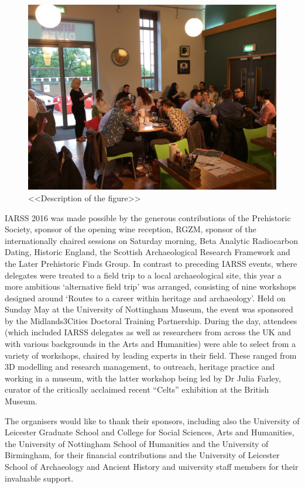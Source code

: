 \documentclass[ngerman,english]{ijsra}
\begin{document}
\begin{figure}[!b]
\includegraphics[width=\linewidth]{figures/IARSS_Quiz}
\caption{<<Description of the figure>>}
\label{fig:IARSS_Quiz}
\end{figure} 
IARSS 2016 was made possible by the generous contributions of the Prehistoric Society, sponsor of the opening wine reception, RGZM, 
sponsor of the internationally chaired sessions on Saturday morning, 
Beta Analytic Radiocarbon Dating, Historic England, the Scottish Archaeological Research Framework and the Later Prehistoric Finds Group. 
In contrast to preceding IARSS events, where delegates were treated to a field trip to a local archaeological site, this year a more ambitious ‘alternative field trip’ was arranged, consisting of nine workshops designed around ‘Routes to a career within heritage and archaeology’. 
Held on Sunday  May at the University of Nottingham Museum, the event was sponsored by the Midlands3Cities Doctoral Training Partnership. 
During the day, attendees (which included IARSS delegates as well as researchers from across the UK and with various backgrounds in the Arts and Humanities) were able to select from a variety of workshops, chaired by leading experts in their field. These ranged from 3D modelling and research management, to outreach, heritage practice and working in a museum, with the latter workshop being led by Dr Julia Farley, curator of the critically acclaimed recent \enquote{Celts} exhibition at the British Museum.

The organisers would like to thank their sponsors, including also the University of Leicester Graduate School and College for Social Sciences, Arts and Humanities, the University of Nottingham School of Humanities and the University of Birmingham, for their financial contributions and the University of Leicester School of Archaeology and Ancient History and university staff members for their invaluable support. 



\IJSRAclosing%
\end{document}
